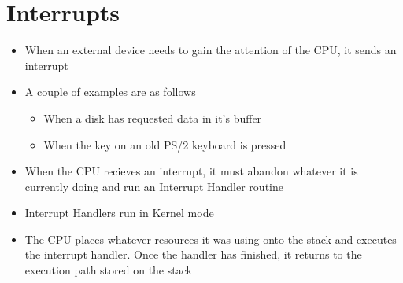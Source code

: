 \section*{Interrupts}

\begin{itemize}
  \item When an external device needs to gain the attention of the CPU, it sends an interrupt
  \item A couple of examples are as follows
  \begin{itemize}
    \item When a disk has requested data in it's buffer
    \item When the key on an old PS/2 keyboard is pressed
  \end{itemize}
  \item When the CPU recieves an interrupt, it must abandon whatever it is currently doing and run an Interrupt Handler routine
  \item Interrupt Handlers run in Kernel mode
  \item The CPU places whatever resources it was using onto the stack and executes the interrupt handler. Once the handler has finished, it returns to the execution path stored on the stack
\end{itemize}